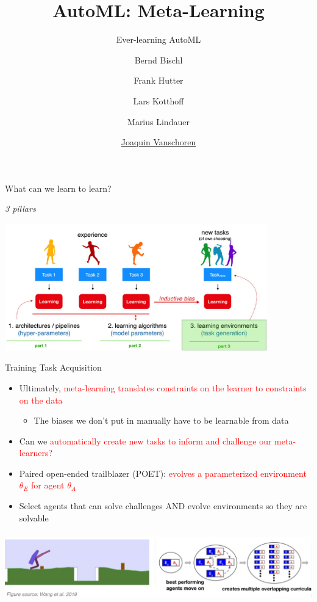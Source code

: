 
\usepackage{multimedia}

\title[Meta-Learning]{AutoML: Meta-Learning} 
\subtitle{Ever-learning AutoML}
\author[Joaquin Vanschoren]{Bernd Bischl \and Frank Hutter \and Lars Kotthoff\newline \and Marius Lindauer \and \underline{Joaquin Vanschoren}}
\institute{}
\date{}


\maketitle

\begin{frame}{What can we learn to learn?}
    \centerline{\textit{3 pillars}}
    \centering\includegraphics[height=5.5cm]{image/img014300.jpg}
\end{frame}
\begin{frame}{Training Task Acquisition}
    \begin{itemize}
        \item Ultimately, \textcolor{red}{meta-learning translates constraints on the learner to constraints on the data}
        \begin{itemize}
            \item The biases we don’t put in manually have to be learnable from data
        \end{itemize}
        \item Can we \textcolor{red}{automatically create new tasks to inform and challenge our meta-learners?} 
        \item Paired open-ended trailblazer (POET): \textcolor{red}{evolves a parameterized environment $\theta_E$ for agent $\theta_A$ }
        \item Select agents that can solve challenges AND evolve environments so they are solvable
    \end{itemize}
    \centering\includegraphics[height=3cm]{image/img014755.jpg}
\end{frame}

